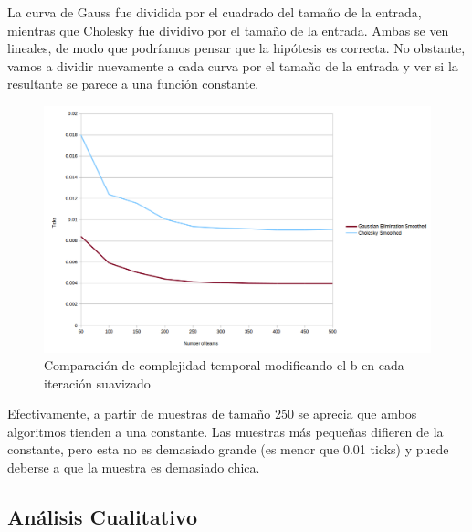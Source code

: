 La curva de Gauss fue dividida por el cuadrado del tama\~no de la entrada, mientras que Cholesky fue dividivo por el tama\~no de la entrada. Ambas se ven lineales, de modo que podr\'iamos pensar que la hip\'otesis es correcta. No obstante, vamos a dividir nuevamente a cada curva por el tama\~no de la entrada y ver si la resultante se parece a una funci\'on constante.

\newpage

\begin{figure}[h!]
  \begin{center}
	\includegraphics[scale=0.50]{imagenes/cuantitative/bChange/ColleyMatrixCuantitativeBChangeAnalysisConstant.png}
	\caption{Comparaci\'on de complejidad temporal modificando el b en cada iteraci\'on suavizado}
	\label{bChangeSmoothed}
  \end{center}
\end{figure}

Efectivamente, a partir de muestras de tama\~no 250 se aprecia que ambos algoritmos tienden a una constante. Las muestras m\'as peque\~nas difieren de la constante, pero esta no es demasiado grande (es menor que 0.01 ticks) y puede deberse a que la muestra es demasiado chica.

\subsection{An\'alisis Cualitativo}
